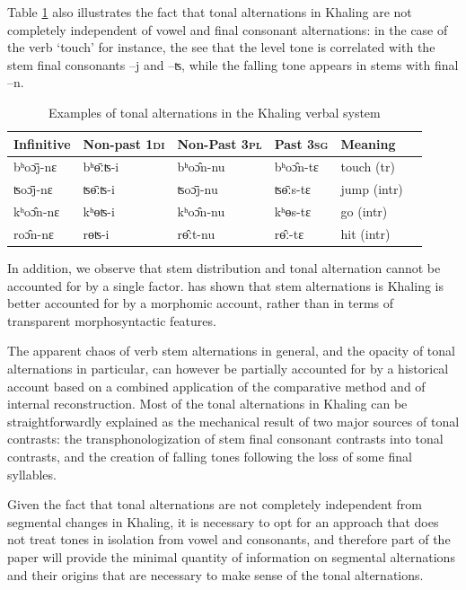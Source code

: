 \documentclass[oldfontcommands,oneside,a4paper,11pt]{article}
\newcommand{\ipa}[1]{{\phon \mbox{#1}}} %
\begin{document}
Table \ref{tab:intro} also illustrates the fact that tonal alternations in Khaling are not completely independent of vowel and final consonant alternations: in the case of the verb `touch' for instance, the see that the level tone is correlated with the stem final consonants \ipa{--j} and \ipa{--ʦ}, while the falling tone appears in stems with final \ipa{--n}.


\begin{table}[h]
\caption{Examples of tonal alternations in the Khaling verbal system} \centering \label{tab:intro}
\begin{tabular}{llllll}
\toprule
Infinitive & Non-past \textsc{1di} & Non-Past \textsc{3pl} & Past \textsc{3sg} & Meaning \\
\midrule
\ipa{bʰoɔ̄j-nɛ} &	\ipa{bʰɵ̄ːʦ-i} &	\ipa{bʰoɔ̂n-nu} &	\ipa{bʰoɔ̂n-tɛ} &	touch	(tr) \\
\ipa{ʦoɔ̄j-nɛ} &	\ipa{ʦɵ̄ːʦ-i} &	\ipa{ʦoɔ̄j-nu} &	\ipa{ʦɵ̄ːs-tɛ} &	jump	(intr) \\
\ipa{kʰoɔ̂n-nɛ} &	\ipa{kʰɵʦ-i} &	\ipa{kʰoɔ̂n-nu} &	\ipa{kʰɵs-tɛ} &	go	(intr) \\
\ipa{roɔ̂n-nɛ} &	\ipa{rɵʦ-i} &	\ipa{rɵ̂ːt-nu} &	\ipa{rɵ̂ː-tɛ} &	hit	(intr) \\
\bottomrule
\end{tabular}
\end{table}

In addition, we observe that stem distribution and tonal alternation cannot be accounted for by a single factor. \citet{walther14compactness} has shown that stem alternations is Khaling is better accounted for by a morphomic account, rather than in terms of transparent morphosyntactic features. 

The apparent chaos of verb stem alternations in general, and the opacity of tonal alternations in particular, can however be partially accounted for  by a historical account based on a combined application of the comparative method and of internal reconstruction. Most of the tonal alternations in Khaling can be straightforwardly explained as the mechanical result of two major sources of tonal contrasts: the transphonologization of stem final consonant contrasts into tonal contrasts, and the creation of falling tones following the loss of some final syllables.

Given the fact that tonal alternations are not completely independent from segmental changes in Khaling, it is necessary to opt for an approach that does not treat tones in isolation from vowel and consonants, and therefore part of the paper will provide the minimal quantity of information on segmental alternations and their origins that are necessary to make sense  of the tonal alternations.
\end{document}
